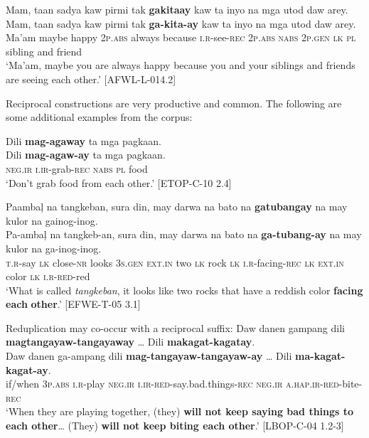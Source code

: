 \ea
\label{bkm:Ref501776849}
Mam,  taan  sadya  kaw  pirmi  tak  \textbf{gakitaay}  kaw  ta inyo  na  mga  utod  daw  arey. \\\smallskip
\gll Mam,  taan  sadya  kaw  pirmi  tak  \textbf{ga-kita-ay}  kaw  ta inyo  na  mga  utod  daw  arey. \\
Ma’am  maybe  happy  2\textsc{p.abs}  always  because  \textsc{i.r}-see-\textsc{rec}  2\textsc{p.abs} \textsc{nabs}
2\textsc{p.gen}  \textsc{lk}  \textsc{pl}  sibling  and  friend \\
\glt `Ma’am,  maybe you are always happy because you and your siblings and friends are seeing each other.’ [AFWL-L-014.2]
\z

Reciprocal constructions are very productive and common. The following are some additional examples from the corpus:

\ea
Dili  \textbf{mag-agaway}  ta  mga  pagkaan. \\\smallskip
\gll Dili  \textbf{mag-agaw-ay}  ta  mga  pagkaan. \\
\textsc{neg.ir}  \textsc{i.ir}-grab-\textsc{rec}  \textsc{nabs}  \textsc{pl}  food \\
\glt ‘Don’t grab food from each other.’ [ETOP-C-10 2.4]
\z

\ea
\label{bkm:Ref414775243}
Paambaļ  na  tangkeban,  sura  din,  may  darwa  na  bato na  \textbf{gatubangay}  na  may  kulor  na  gainog-inog. \\\smallskip
\gll Pa-ambaļ  na  tangkeb-an,  sura  din,  may  darwa  na  bato na  \textbf{ga-tubang-ay}  na  may  kulor  na  ga-inog-inog.\footnotemark{} \\
\textsc{t.r}-say  \textsc{lk} close-\textsc{nr}  looks  3\textsc{s.gen}  \textsc{ext.in}  two  \textsc{lk}  rock \textsc{lk}  \textsc{i.r}-facing-\textsc{rec}  \textsc{lk}  \textsc{ext.in} color  \textsc{lk}  \textsc{i.r}-\textsc{red}-red \\
\glt `What is called \textit{tangkeban}, it looks like two rocks that have a reddish color \textbf{facing} \textbf{each} \textbf{other}.’ [EFWE-T-05 3.1]
\z

Reduplication may co-occur with a reciprocal suffix:
\ea
Daw  danen  gampang  dili  \textbf{magtangayaw-tangayaway} … Dili \textbf{makagat-kagatay}. \\\smallskip
\gll Daw  danen  ga-ampang  dili  \textbf{mag-tangayaw-tangayaw-ay} … Dili  \textbf{ma-kagat-kagat-ay}. \\
if/when  3\textsc{p.abs}  \textsc{i.r}-play  \textsc{neg.ir} \textsc{i.ir}-\textsc{red}-say.bad.things-\textsc{rec} {} \textsc{neg.ir} \textsc{a.hap.ir-red}-bite-\textsc{rec} \\
\glt `When they are playing together, (they) \textbf{will not keep saying bad things to each other}… (They) \textbf{will not keep biting each other}.’ [LBOP-C-04 1.2-3]
\z

